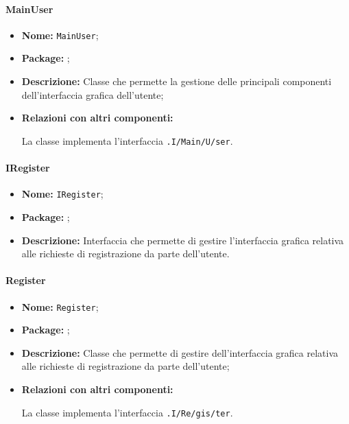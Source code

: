 \paragraph{MainUser}
\begin{flushleft}
\begin{itemize}
\item \textbf{Nome:} \texttt{MainUser};
\item \textbf{Package:} \texttt{\viewUser{}};
\item \textbf{Descrizione:} Classe che permette la gestione delle principali componenti dell'interfaccia grafica dell'utente;
\item \textbf{Relazioni con altri componenti:}
\begin{sloppypar}
La classe implementa l'interfaccia \texttt{\viewUser{}.I\fshyp{}Main\fshyp{}U\fshyp{}ser}.
\end{sloppypar}
\end{itemize}
\end{flushleft}

\paragraph{IRegister}
\begin{itemize}
\item \textbf{Nome:} \texttt{IRegister};
\item \textbf{Package:} \texttt{\viewUser{}};
\item \textbf{Descrizione:} Interfaccia che permette di gestire l'interfaccia grafica relativa alle richieste di registrazione da parte dell'utente.
\end{itemize}

\paragraph{Register}
\begin{flushleft}
\begin{itemize}
\item \textbf{Nome:} \texttt{Register};
\item \textbf{Package:} \texttt{\viewUser{}};
\item \textbf{Descrizione:} Classe che permette di gestire dell'interfaccia grafica relativa alle richieste di registrazione da parte dell'utente;
\item \textbf{Relazioni con altri componenti:}
\begin{sloppypar}
La classe implementa l'interfaccia \texttt{\viewUser{}.I\fshyp{}Re\fshyp{}gis\fshyp{}ter}.
\end{sloppypar}
\end{itemize}
\end{flushleft}

